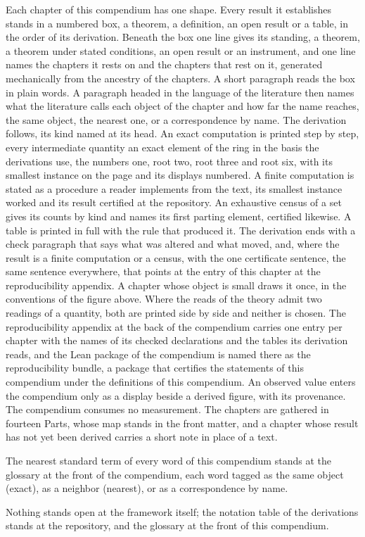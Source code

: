Each chapter of this compendium has one shape. Every result it establishes stands in a numbered box, a theorem, a definition, an open result or a table, in the order of its derivation. Beneath the box one line gives its standing, a theorem, a theorem under stated conditions, an open result or an instrument, and one line names the chapters it rests on and the chapters that rest on it, generated mechanically from the ancestry of the chapters. A short paragraph reads the box in plain words. A paragraph headed in the language of the literature then names what the literature calls each object of the chapter and how far the name reaches, the same object, the nearest one, or a correspondence by name. The derivation follows, its kind named at its head. An exact computation is printed step by step, every intermediate quantity an exact element of the ring in the basis the derivations use, the numbers one, root two, root three and root six, with its smallest instance on the page and its displays numbered. A finite computation is stated as a procedure a reader implements from the text, its smallest instance worked and its result certified at the repository. An exhaustive census of a set gives its counts by kind and names its first parting element, certified likewise. A table is printed in full with the rule that produced it. The derivation ends with a check paragraph that says what was altered and what moved, and, where the result is a finite computation or a census, with the one certificate sentence, the same sentence everywhere, that points at the entry of this chapter at the reproducibility appendix. A chapter whose object is small draws it once, in the conventions of the figure above. Where the reads of the theory admit two readings of a quantity, both are printed side by side and neither is chosen. The reproducibility appendix at the back of the compendium carries one entry per chapter with the names of its checked declarations and the tables its derivation reads, and the Lean package of the compendium is named there as the reproducibility bundle, a package that certifies the statements of this compendium under the definitions of this compendium. An observed value enters the compendium only as a display beside a derived figure, with its provenance. The compendium consumes no measurement. The chapters are gathered in fourteen Parts, whose map stands in the front matter, and a chapter whose result has not yet been derived carries a short note in place of a text.
\begin{chbridge}
The nearest standard term of every word of this compendium stands at the glossary at the front of the compendium, each word tagged as the same object (exact), as a neighbor (nearest), or as a correspondence by name.
\end{chbridge}
Nothing stands open at the framework itself; the notation table of the derivations stands at the repository, and the glossary at the front of this compendium.

